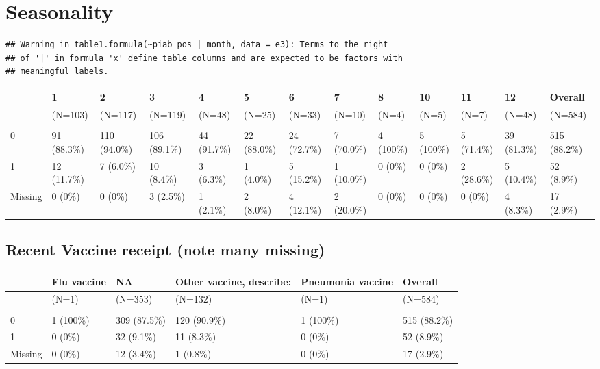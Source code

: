 \documentclass[
]{article}
\begin{document}
\hypertarget{seasonality}{%
\section{Seasonality}\label{seasonality}}

\begin{verbatim}
## Warning in table1.formula(~piab_pos | month, data = e3): Terms to the right
## of '|' in formula 'x' define table columns and are expected to be factors with
## meaningful labels.
\end{verbatim}

\begin{tabular}[t]{lllllllllllll}
\toprule
  & 1 & 2 & 3 & 4 & 5 & 6 & 7 & 8 & 10 & 11 & 12 & Overall\\
\midrule
 & (N=103) & (N=117) & (N=119) & (N=48) & (N=25) & (N=33) & (N=10) & (N=4) & (N=5) & (N=7) & (N=48) & (N=584)\\
\addlinespace[0.3em]
\multicolumn{13}{l}{\textbf{piab\_pos}}\\
\hspace{1em}0 & 91 (88.3\%) & 110 (94.0\%) & 106 (89.1\%) & 44 (91.7\%) & 22 (88.0\%) & 24 (72.7\%) & 7 (70.0\%) & 4 (100\%) & 5 (100\%) & 5 (71.4\%) & 39 (81.3\%) & 515 (88.2\%)\\
\hspace{1em}1 & 12 (11.7\%) & 7 (6.0\%) & 10 (8.4\%) & 3 (6.3\%) & 1 (4.0\%) & 5 (15.2\%) & 1 (10.0\%) & 0 (0\%) & 0 (0\%) & 2 (28.6\%) & 5 (10.4\%) & 52 (8.9\%)\\
\hspace{1em}Missing & 0 (0\%) & 0 (0\%) & 3 (2.5\%) & 1 (2.1\%) & 2 (8.0\%) & 4 (12.1\%) & 2 (20.0\%) & 0 (0\%) & 0 (0\%) & 0 (0\%) & 4 (8.3\%) & 17 (2.9\%)\\
\bottomrule
\end{tabular}

\hypertarget{recent-vaccine-receipt-note-many-missing}{%
\subsection{Recent Vaccine receipt (note many
missing)}\label{recent-vaccine-receipt-note-many-missing}}

\begin{tabular}[t]{llllll}
\toprule
  & Flu vaccine & NA & Other vaccine, describe: & Pneumonia vaccine & Overall\\
\midrule
 & (N=1) & (N=353) & (N=132) & (N=1) & (N=584)\\
\addlinespace[0.3em]
\multicolumn{6}{l}{\textbf{piab\_pos}}\\
\hspace{1em}0 & 1 (100\%) & 309 (87.5\%) & 120 (90.9\%) & 1 (100\%) & 515 (88.2\%)\\
\hspace{1em}1 & 0 (0\%) & 32 (9.1\%) & 11 (8.3\%) & 0 (0\%) & 52 (8.9\%)\\
\hspace{1em}Missing & 0 (0\%) & 12 (3.4\%) & 1 (0.8\%) & 0 (0\%) & 17 (2.9\%)\\
\bottomrule
\end{tabular}
\end{document}
